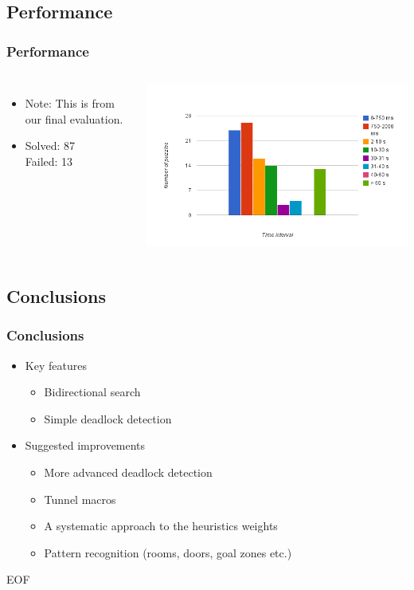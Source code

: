 \documentclass[]{beamer}
\begin{document}
\subsection{Performance}
\begin{frame}
	\frametitle{Performance}
	\begin{columns}
		\begin{itemize}
			\item{Note: This is from our final evaluation.}
			\item{Solved: 87\\ Failed: 13}
		\end{itemize}
		\includegraphics[width=\textwidth]{time_graph}
	\end{columns}
\end{frame}

\subsection{Conclusions}
\begin{frame}
	\frametitle{Conclusions}
	\begin{itemize}
		\item{Key features
			\begin{itemize}
				\item{Bidirectional search}
				\item{Simple deadlock detection}
			\end{itemize}
		}
		\item{Suggested improvements

			\begin{itemize}
				\item{More advanced deadlock detection}
				\item{Tunnel macros}
				\item{A systematic approach to the heuristics weights}
				\item{Pattern recognition (rooms, doors, goal zones etc.)}
			\end{itemize}
		}
	\end{itemize}
\end{frame}

\begin{frame}
	\begin{center}
		EOF
	\end{center}
\end{frame}
\end{document}
